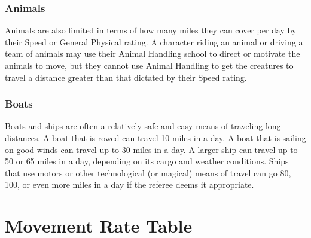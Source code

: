 \documentclass[oneside]{book}
\begin{document}
\begin{multicols}{2}
\subsubsection{Animals}
Animals are also limited in terms of how many miles they can cover per day by their Speed or General Physical rating. A character riding an animal or driving a team of animals may use their Animal Handling school to direct or motivate the animals to move, but they cannot use Animal Handling to get the creatures to travel a distance greater than that dictated by their Speed rating.

\subsubsection{Boats}
Boats and ships are often a relatively safe and easy means of traveling long distances. A boat that is rowed can travel 10 miles in a day. A boat that is sailing on good winds can travel up to 30 miles in a day. A larger ship can travel up to 50 or 65 miles in a day, depending on its cargo and weather conditions. Ships that use motors or other technological (or magical) means of travel can go 80, 100, or even more miles in a day if the referee deems it appropriate. 

\section{Movement Rate Table}


\end{multicols}
\end{document}
